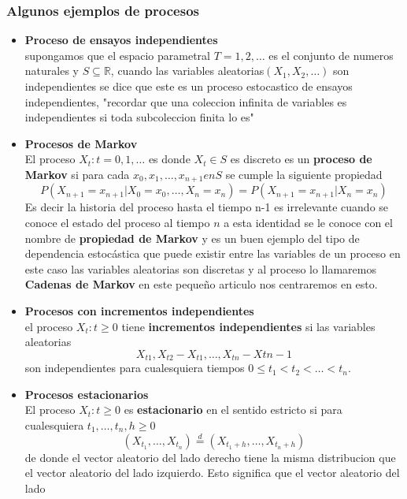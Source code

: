 \documentclass[10pt,a4paper]{article}
\theoremstyle{definition}
\theoremstyle{remark}
\begin{document}
\begin{multicols}{2}
\subsubsection{Algunos ejemplos de procesos}
\begin{itemize}
	\item \textbf{Proceso de ensayos independientes}\\
	supongamos que el espacio parametral $T={1,2,\dots}$ es el conjunto de numeros 
	naturales y $S \subseteq \mathbb{R}$, cuando las variables aleatorias$(X_{1},X_{2},
	\dots)$ son independientes se dice que este es un proceso estocastico de
	ensayos independientes, "recordar que una coleccion infinita de variables es 
	independientes si toda subcoleccion finita lo es" \\
	\item \textbf{Procesos de Markov} \\
	El proceso ${X_{t}: t=0,1,\dots}$ es donde $X_{t} \in S$ es discreto es un 
	\textbf{proceso de Markov} si para cada $x_0,x_1,\dots,x_{n+1} en S$ se cumple la 
	siguiente propiedad 
	$$ P(X_{n+1}=x_{n+1}|X_0=x_0,\dots,X_n=x_n)=P(X_{n+1}=x_{n+1}|X_{n}=x_n) $$
	Es decir la historia del proceso hasta el tiempo n-1 es irrelevante cuando se conoce 
	el estado del proceso al tiempo $n$ a esta identidad se le conoce con el nombre de 
	\textbf{propiedad de Markov} y es un buen ejemplo del tipo de 
	dependencia estocástica que puede existir entre las variables de un proceso en este 
	caso las variables aleatorias son discretas y al proceso lo llamaremos 
	\textbf{Cadenas 
	de Markov} en este pequeño articulo nos centraremos en esto. \\
	\item \textbf{Procesos con incrementos independientes} \\
	el proceso $ {X_{t}: t \geq 0}$ tiene \textbf{incrementos independientes} si las 
	variables aleatorias $$X_{t1},X_{t2}-X_{t1},\dots, X_{tn}- X{tn-1}$$ son 
	independientes 
	para cualesquiera tiempos  $0\leq t_{1}<t_{2}<\dots<t_{n}.$\\
	\item \textbf{Procesos estacionarios}\\
	El proceso ${X_{t}:t\geq0}$ es \textbf{estacionario} en el sentido estricto si para 
	cualesquiera $t_1,\dots,t_n,h \geq 0$
	$$(X_{t_1},\dots,X_{t_n})\stackrel{d}{=}(X_{t_1+h},\dots,X_{t_n+h})$$
	de donde el vector aleatorio del lado derecho tiene la misma distribucion que el 
	vector aleatorio del lado izquierdo. Esto significa que el vector aleatorio del lado 

\end{itemize}
\end{multicols}
\end{document}

